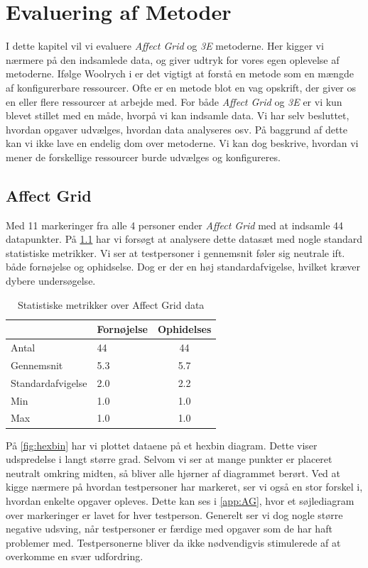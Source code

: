 \chapter{Evaluering af Metoder}\label{ch:evalmet}
I dette kapitel vil vi evaluere \textit{Affect Grid} og \textit{3E} metoderne. Her kigger vi nærmere på den indsamlede data, og giver udtryk for vores egen oplevelse af metoderne. Ifølge Woolrych i \cite{Woolrych} er det vigtigt at forstå en metode som en mængde af konfigurerbare ressourcer. Ofte er en metode blot en vag opskrift, der giver os en eller flere ressourcer at arbejde med. For både \textit{Affect Grid} og \textit{3E} er vi kun blevet stillet med en måde, hvorpå vi kan indsamle data. Vi har selv besluttet, hvordan opgaver udvælges, hvordan data analyseres osv. På baggrund af dette kan vi ikke lave en endelig dom over metoderne. Vi kan dog beskrive, hvordan vi mener de forskellige ressourcer burde udvælges og konfigureres.

\section{Affect Grid}\label{sec:evalAG}
Med 11 markeringer fra alle 4 personer ender \textit{Affect Grid} med at indsamle 44 datapunkter. På \cref{tab:AG} har vi forsøgt at analysere dette datasæt med nogle standard statistiske metrikker. Vi ser at testpersoner i gennemsnit føler sig neutrale ift. både fornøjelse og ophidselse. Dog er der en høj standardafvigelse, hvilket kræver dybere undersøgelse.  

\begin{table}[]
\centering
\caption{Statistiske metrikker over Affect Grid data}
\label{tab:AG}
\begin{tabular}{|l|l|c|}
\hline
                  & Fornøjelse & Ophidelses               \\ \hline
Antal             & 44         & 44                       \\ \hline
Gennemsnit        & 5.3        & 5.7                      \\ \hline
Standardafvigelse & 2.0        & 2.2                      \\ \hline
Min               & 1.0        & 1.0 \\ \hline
Max               & 1.0        & 1.0 \\ \hline
\end{tabular}
\end{table}

På \cref{fig:hexbin} har vi plottet dataene på et hexbin diagram. Dette viser udspredelse i langt større grad. Selvom vi ser at mange punkter er placeret neutralt omkring midten, så bliver alle hjørner af diagrammet berørt. Ved at kigge nærmere på hvordan testpersoner har markeret, ser vi også en stor forskel i, hvordan enkelte opgaver opleves. Dette kan ses i \cref{app:AG}, hvor et søjlediagram over markeringer er lavet for hver testperson. Generelt ser vi dog nogle større negative udsving, når testpersoner er færdige med opgaver som de har haft problemer med. Testpersonerne bliver da ikke nødvendigvis stimulerede af at overkomme en svær udfordring. 

